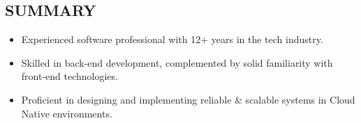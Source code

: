 \subsection*{SUMMARY}

\begin{itemize}[leftmargin=*,labelsep=1mm]
  \setlength{\parskip}{0mm}
  \setlength{\itemsep}{1mm}
  \item Experienced software professional with 12+ years in the tech industry.

  \item Skilled in back-end development, complemented by solid familiarity with front-end technologies.
  
  \item Proficient in designing and implementing reliable \& scalable systems in Cloud Native environments.
\end{itemize}
